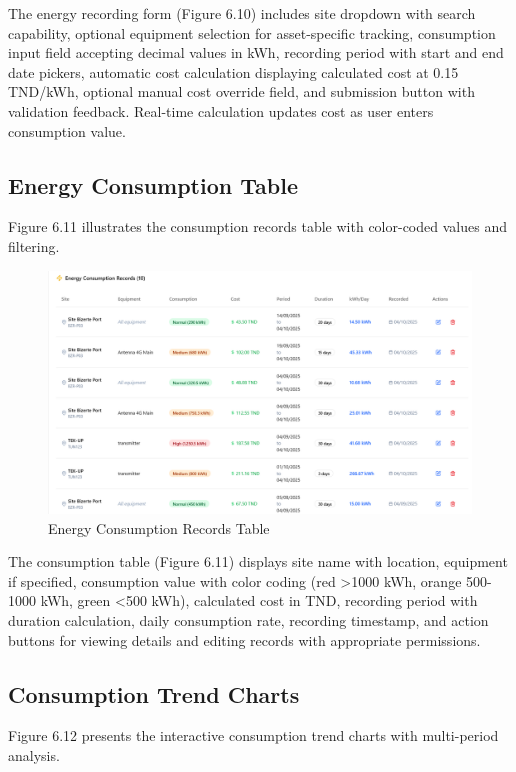 The energy recording form (Figure 6.10) includes site dropdown with search capability, optional equipment selection for asset-specific tracking, consumption input field accepting decimal values in kWh, recording period with start and end date pickers, automatic cost calculation displaying calculated cost at 0.15 TND/kWh, optional manual cost override field, and submission button with validation feedback. Real-time calculation updates cost as user enters consumption value.

\subsection{Energy Consumption Table}

Figure 6.11 illustrates the consumption records table with color-coded values and filtering.

\begin{figure}[H]
    \centering
    \includegraphics[width=0.9\linewidth]{img/chap_06/screenshot_energy_table.png}
    \caption{Energy Consumption Records Table}
    \label{fig:energy_table}
\end{figure}

The consumption table (Figure 6.11) displays site name with location, equipment if specified, consumption value with color coding (red >1000 kWh, orange 500-1000 kWh, green <500 kWh), calculated cost in TND, recording period with duration calculation, daily consumption rate, recording timestamp, and action buttons for viewing details and editing records with appropriate permissions.

\subsection{Consumption Trend Charts}

Figure 6.12 presents the interactive consumption trend charts with multi-period analysis.


